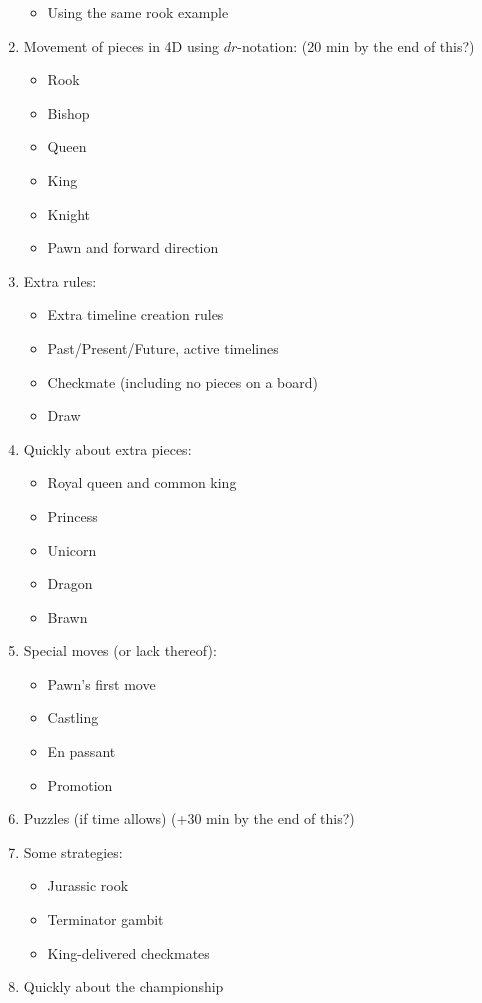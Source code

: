 \begin{enumerate}
\begin{itemize}
			\item Using the same rook example
		\end{itemize}
	\item Movement of pieces in 4D using $dr$-notation: (20 min by the end of this?)
        \begin{itemize}
	        \item Rook
	        \item Bishop
	        \item Queen
	        \item King
	        \item Knight
			\item Pawn and forward direction
	    \end{itemize}
	\item Extra rules:
		\begin{itemize}
			\item Extra timeline creation rules
			\item Past/Present/Future, active timelines
			\item Checkmate (including no pieces on a board)
			\item Draw
		\end{itemize}
	\item Quickly about extra pieces:
        \begin{itemize}
	        \item Royal queen and common king
	        \item Princess
	        \item Unicorn
	        \item Dragon
	        \item Brawn
	    \end{itemize}
	\item Special moves (or lack thereof):
        \begin{itemize}
	        \item Pawn's first move
	        \item Castling
	        \item En passant
	        \item Promotion
	    \end{itemize}
	\item Puzzles (if time allows) (+30 min by the end of this?)
	\item Some strategies:
		\begin{itemize}
			\item Jurassic rook
			\item Terminator gambit
			\item King-delivered checkmates
		\end{itemize}
	\item Quickly about the championship
\end{enumerate}






\printbibliography

